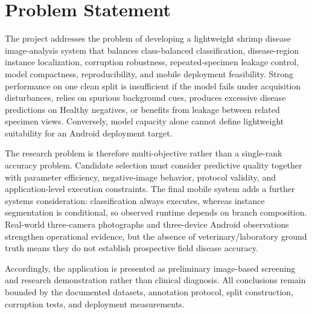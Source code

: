 \documentclass[12pt,a4paper]{report}
\newenvironment{revisionblock}{\begin{snugshade}\noindent}{\end{snugshade}}
\begin{document}
\section{\texorpdfstring{\colorbox{RevisionYellow}{Problem Statement}}{Problem Statement}}
\begin{revisionblock}
The project addresses the problem of developing a lightweight shrimp disease image-analysis system that balances class-balanced classification, disease-region instance localization, corruption robustness, repeated-specimen leakage control, model compactness, reproducibility, and mobile deployment feasibility. Strong performance on one clean split is insufficient if the model fails under acquisition disturbances, relies on spurious background cues, produces excessive disease predictions on Healthy negatives, or benefits from leakage between related specimen views. Conversely, model capacity alone cannot define lightweight suitability for an Android deployment target.
\end{revisionblock}
\begin{revisionblock}
The research problem is therefore multi-objective rather than a single-rank accuracy problem. Candidate selection must consider predictive quality together with parameter efficiency, negative-image behavior, protocol validity, and application-level execution constraints. The final mobile system adds a further systems consideration: classification always executes, whereas instance segmentation is conditional, so observed runtime depends on branch composition. Real-world three-camera photographs and three-device Android observations strengthen operational evidence, but the absence of veterinary/laboratory ground truth means they do not establish prospective field disease accuracy.
\end{revisionblock}
\begin{revisionblock}
Accordingly, the application is presented as preliminary image-based screening and research demonstration rather than clinical diagnosis. All conclusions remain bounded by the documented datasets, annotation protocol, split construction, corruption tests, and deployment measurements.
\end{revisionblock}
\end{document}
